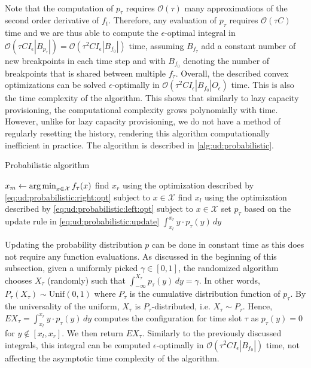 \paragraph{} Note that the computation of $p_{\tau}$ requires $\mathcal{O}(\tau)$ many approximations of the second order derivative of $f_{t}$. Therefore, any evaluation of $p_{\tau}$ requires $\mathcal{O}(\tau C)$ time and we are thus able to compute the $\epsilon$-optimal integral in $\mathcal{O}(\tau C I_{\epsilon} |B_{p_{\tau}}|) = \mathcal{O}(\tau^2 C I_{\epsilon} |B_{f_0}|)$ time, assuming $B_{f_{\tau}}$ add a constant number of new breakpoints in each time step and with $B_{f_0}$ denoting the number of breakpoints that is shared between multiple $f_{\tau}$. Overall, the described convex optimizations can be solved $\epsilon$-optimally in $\mathcal{O}(\tau^2 C I_{\epsilon} |B_{f_0}| O_{\epsilon})$ time. This is also the time complexity of the algorithm. This shows that similarly to lazy capacity provisioning, the computational complexity grows polynomially with time. However, unlike for lazy capacity provisioning, we do not have a method of regularly resetting the history, rendering this algorithm computationally inefficient in practice. The algorithm is described in \autoref{alg:ud:probabilistic}.

\begin{algorithm}
    \caption{Probabilistic algorithm \cite{Bansal2015}}\label{alg:ud:probabilistic}
    $x_m \gets \operatorname*{arg\,min}_{x \in \mathcal{X}} f_{\tau}(x)$\;
    find $x_r$ using the optimization described by \autoref{eq:ud:probabilistic:right:opt} subject to $x \in \mathcal{X}$\;
    find $x_l$ using the optimization described by \autoref{eq:ud:probabilistic:left:opt} subject to $x \in \mathcal{X}$\;
    set $p_{\tau}$ based on the update rule in \autoref{eq:ud:probabilistic:update}\;
    \Return $\int_{x_l}^{x_r} y \cdot p_{\tau}(y) \,dy$\;
\end{algorithm}

Updating the probability distribution $p$ can be done in constant time as this does not require any function evaluations. As discussed in the beginning of this subsection, given a uniformly picked $\gamma \in [0,1]$, the randomized algorithm chooses $X_{\tau}$ (randomly) such that $\int_{-\infty}^{X_{\tau}} p_{\tau}(y) \,dy = \gamma$. In other words, $P_{\tau}(X_{\tau}) \sim \text{Unif}(0,1)$ where $P_{\tau}$ is the cumulative distribution function of $p_{\tau}$. By the universality of the uniform, $X_{\tau}$ is $P_{\tau}$-distributed, i.e. $X_{\tau} \sim P_{\tau}$. Hence, $E X_{\tau} = \int_{x_l}^{x_r} y \cdot p_{\tau}(y) \,dy$ computes the configuration for time slot $\tau$ as $p_{\tau}(y) = 0$ for $y \not\in [x_l, x_r]$. We then return $E X_{\tau}$. Similarly to the previously discussed integrals, this integral can be computed $\epsilon$-optimally in $\mathcal{O}(\tau^2 C I_{\epsilon} |B_{f_0}|)$ time, not affecting the asymptotic time complexity of the algorithm.

